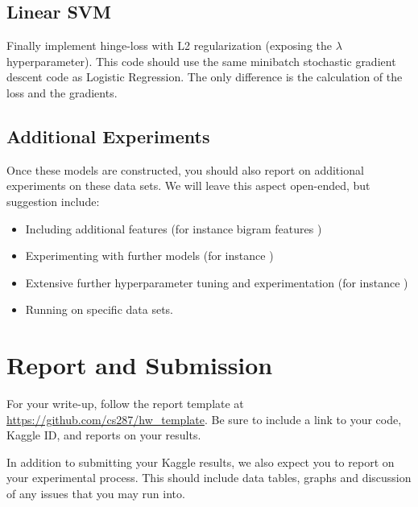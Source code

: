 \documentclass[11pt]{article}
\begin{document}
\subsection{Linear SVM}

Finally implement hinge-loss with L2 regularization (exposing the $\lambda$
hyperparameter). This code should use the same minibatch stochastic
gradient descent code as Logistic Regression. The only difference is
the calculation of the loss and the gradients. 

\subsection{Additional Experiments}

Once these models are constructed, you should also report on
additional experiments on these data sets. We will leave this aspect
open-ended, but suggestion include:

\begin{itemize}
\item Including additional features (for instance bigram features \cite{})
\item Experimenting with further models (for instance \cite{})
\item Extensive further hyperparameter tuning and experimentation (for instance \cite{})
\item Running on specific data sets. 
\end{itemize}

\section{Report and Submission}

For your write-up, follow the report template at
\url{https://github.com/cs287/hw_template}. Be sure to include a link
to your code, Kaggle ID, and reports on your results.

In addition to submitting your Kaggle results, we also expect you to report on your 
experimental process. This should include data tables, graphs and discussion of any 
issues that you may run into. 
\end{document}
